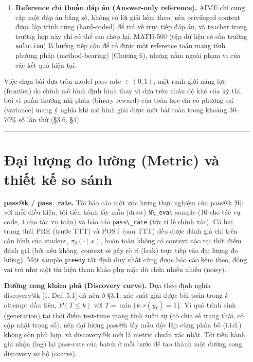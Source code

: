 \begin{enumerate}
\def\labelenumi{\arabic{enumi}.}
\tightlist
\item
  \textbf{Reference chỉ thuần đáp án (Answer-only reference).} AIME chỉ cung cấp một đáp án bằng số, không có lời giải kèm theo, nên privileged context được lập trình cứng (hard-coded) để trả về trực tiếp đáp án, và teacher trong trường hợp này chỉ có thể sao chép lại. MATH-500 (tập dữ liệu có sẵn trường \passthrough{\lstinline!solution!}) là hướng tiếp cận để có được một reference toán mang tính phương pháp (method-bearing) (Chương 6), nhưng nằm ngoài phạm vi của các kết quả hiện tại.
\end{enumerate}

Việc chọn bài dựa trên model pass-rate \(\in (0,1)\), một ranh giới năng lực (frontier) do chính mô hình định hình thay vì dựa trên nhãn độ khó của kỳ thi, bởi vì phần thưởng nhị phân (binary reward) của toán học chỉ có phương sai (variance) mang ý nghĩa khi mô hình giải được một bài toán trong khoảng 30--70\% số lần thử (§3.6, §4).

\begin{center}\rule{0.5\linewidth}{0.5pt}\end{center}

\section{Đại lượng đo lường (Metric) và thiết kế so sánh}\label{metrics-and-comparison-design}

\textbf{pass@k / pass\_rate.} Tôi báo cáo một ước lượng thực nghiệm của pass@k {[}9{]}: với mỗi điều kiện, tôi tiến hành lấy mẫu (draw) \passthrough{\lstinline!N\_eval!} sample (16 cho tác vụ code, 4 cho tác vụ toán) và báo cáo \passthrough{\lstinline!pass\_rate!} (tức tỉ lệ chính xác). Cả hai trạng thái PRE (trước TTT) và POST (sau TTT) đều được đánh giá chỉ trên cấu hình của student, \(\pi_\theta(\cdot\mid x)\), hoàn toàn không có context nào tại thời điểm đánh giá (bởi nếu không, context sẽ gây rò rỉ (leak) trực tiếp vào đại lượng đo lường). Một sample \passthrough{\lstinline!greedy!} tất định duy nhất cũng được báo cáo kèm theo, đóng vai trò như một tín hiệu tham khảo phụ mặc dù chứa nhiều nhiễu (noisy).

\textbf{Đường cong khám phá (Discovery curve).} Dựa theo định nghĩa discovery@k {[}1, Def. 5.1{]} đã nêu ở §3.1: xác suất giải được bài toán trong \(k\) attempt đầu tiên, \(P(T \le k)\) với \(T = \min\{k : r(y_k) = 1\}\). Vì quá trình sinh (generation) tại thời điểm test-time mang tính tuần tự (có chia sẻ trạng thái, có cập nhật trọng số), nên đại lượng pass@k lấy mẫu độc lập cùng phân bố (i.i.d.) không còn phù hợp, và discovery@k mới là metric chuẩn xác nhất. Tôi tiến hành ghi nhận (log) lại pass-rate của batch ở mỗi bước để tạo thành một đường cong discovery sơ bộ (coarse).

